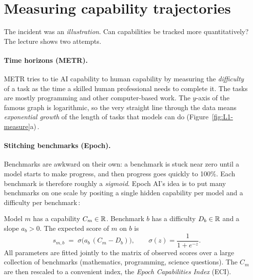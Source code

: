 
\section{Measuring capability trajectories}\label{sec:L1-measuring}
The incident was an \emph{illustration}. Can capabilities be tracked more quantitatively? The lecture shows two attempts.

\paragraph{Time horizons (METR).}
METR tries to tie AI capability to human capability by measuring the \emph{difficulty} of a task as the time a skilled human professional needs to complete it.
The tasks are mostly programming and other computer-based work. The $y$-axis of the famous graph is logarithmic, so the very straight line through the data means \emph{exponential growth}
of the length of tasks that models can do (Figure~\ref{fig:L1-measure}a)\,\citep{kwa2025}.

\paragraph{Stitching benchmarks (Epoch).}
Benchmarks are awkward on their own: a benchmark is stuck near zero until a model starts to make progress, and then progress goes quickly to 100\%. Each benchmark is therefore roughly a \emph{sigmoid}.
Epoch AI's idea is to put many benchmarks on one scale by positing a single hidden capability per model and a difficulty per benchmark\,\citep{epoch2025eci}:

\begin{defn}\label{def:eci}
Model $m$ has a capability $C_m\in\mathbb{R}$. Benchmark $b$ has a difficulty $D_b\in\mathbb{R}$ and a slope $a_b>0$. The expected score of $m$ on $b$ is
\[
  s_{m,b}\;=\;\sigma\!\big(a_b\,(C_m-D_b)\big),\qquad \sigma(z)=\frac1{1+e^{-z}} .
\]
All parameters are fitted jointly to the matrix of observed scores over a large collection of benchmarks (mathematics, programming, science questions). The $C_m$ are then rescaled
to a convenient index, the \emph{Epoch Capabilities Index} (ECI).
\end{defn}


